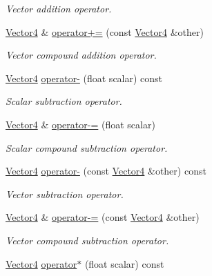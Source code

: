 \begin{DoxyCompactItemize}
\begin{DoxyCompactList}\small\item\em Vector addition operator. \end{DoxyCompactList}\item 
\hyperlink{classchaos_1_1gfx_1_1_vector4}{Vector4} \& \hyperlink{classchaos_1_1gfx_1_1_vector4_afda4d8356ac748b55f100ca9598fa6ab}{operator+=} (const \hyperlink{classchaos_1_1gfx_1_1_vector4}{Vector4} \&other)
\begin{DoxyCompactList}\small\item\em Vector compound addition operator. \end{DoxyCompactList}\item 
\hyperlink{classchaos_1_1gfx_1_1_vector4}{Vector4} \hyperlink{classchaos_1_1gfx_1_1_vector4_af4f001e9cb65320da1831cebcab8d859}{operator-\/} (float scalar) const 
\begin{DoxyCompactList}\small\item\em Scalar subtraction operator. \end{DoxyCompactList}\item 
\hyperlink{classchaos_1_1gfx_1_1_vector4}{Vector4} \& \hyperlink{classchaos_1_1gfx_1_1_vector4_a0d6a6c74179d2b8963b6c1bedd83bf5e}{operator-\/=} (float scalar)
\begin{DoxyCompactList}\small\item\em Scalar compound subtraction operator. \end{DoxyCompactList}\item 
\hyperlink{classchaos_1_1gfx_1_1_vector4}{Vector4} \hyperlink{classchaos_1_1gfx_1_1_vector4_af923be6632e670c30a3e86683b47d903}{operator-\/} (const \hyperlink{classchaos_1_1gfx_1_1_vector4}{Vector4} \&other) const 
\begin{DoxyCompactList}\small\item\em Vector subtraction operator. \end{DoxyCompactList}\item 
\hyperlink{classchaos_1_1gfx_1_1_vector4}{Vector4} \& \hyperlink{classchaos_1_1gfx_1_1_vector4_aba6caefa7d369b2019347462999802ea}{operator-\/=} (const \hyperlink{classchaos_1_1gfx_1_1_vector4}{Vector4} \&other)
\begin{DoxyCompactList}\small\item\em Vector compound subtraction operator. \end{DoxyCompactList}\item 
\hyperlink{classchaos_1_1gfx_1_1_vector4}{Vector4} \hyperlink{classchaos_1_1gfx_1_1_vector4_afee77ed144ba58fae3877ddbebcd75d3}{operator$\ast$} (float scalar) const 

\end{DoxyCompactItemize}
